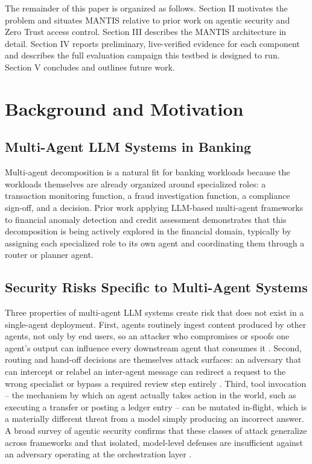 \documentclass[conference]{IEEEtran}
\begin{document}
The remainder of this paper is organized as follows. Section II motivates the problem and situates MANTIS relative to prior work on agentic security and Zero Trust access control. Section III describes the MANTIS architecture in detail. Section IV reports preliminary, live-verified evidence for each component and describes the full evaluation campaign this testbed is designed to run. Section V concludes and outlines future work.

\section{Background and Motivation}

\subsection{Multi-Agent LLM Systems in Banking}
Multi-agent decomposition is a natural fit for banking workloads because the workloads themselves are already organized around specialized roles: a transaction monitoring function, a fraud investigation function, a compliance sign-off, and a decision. Prior work applying LLM-based multi-agent frameworks to financial anomaly detection \cite{anomaly_detection_finance} and credit assessment \cite{masca_credit} demonstrates that this decomposition is being actively explored in the financial domain, typically by assigning each specialized role to its own agent and coordinating them through a router or planner agent.

\subsection{Security Risks Specific to Multi-Agent Systems}
Three properties of multi-agent LLM systems create risk that does not exist in a single-agent deployment. First, agents routinely ingest content produced by other agents, not only by end users, so an attacker who compromises or spoofs one agent's output can influence every downstream agent that consumes it \cite{prompt_infection}. Second, routing and hand-off decisions are themselves attack surfaces: an adversary that can intercept or relabel an inter-agent message can redirect a request to the wrong specialist or bypass a required review step entirely \cite{aitm_communication_attacks}. Third, tool invocation -- the mechanism by which an agent actually takes action in the world, such as executing a transfer or posting a ledger entry -- can be mutated in-flight, which is a materially different threat from a model simply producing an incorrect answer. A broad survey of agentic security confirms that these classes of attack generalize across frameworks and that isolated, model-level defenses are insufficient against an adversary operating at the orchestration layer \cite{agentic_security_survey, security_considerations_mas}.
\end{document}
